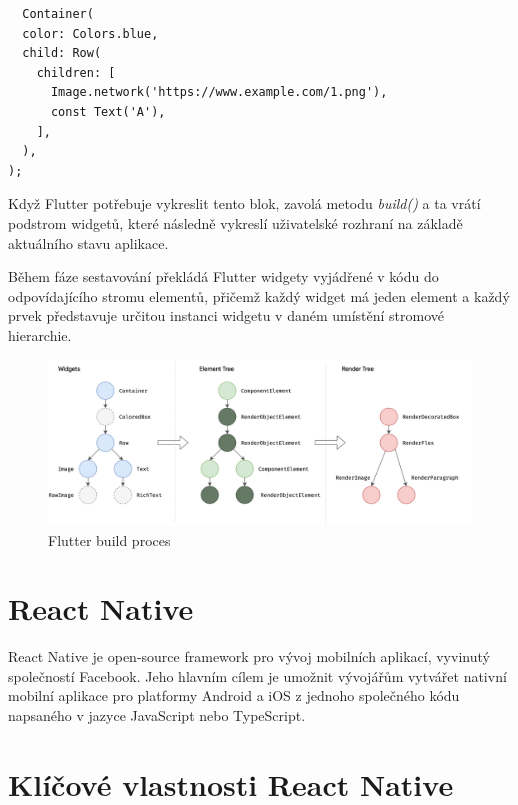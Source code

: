 \begin{lstlisting}
  Container(
  color: Colors.blue,
  child: Row(
    children: [
      Image.network('https://www.example.com/1.png'),
      const Text('A'),
    ],
  ),
);
\end{lstlisting}

Když Flutter potřebuje vykreslit tento blok, zavolá metodu \emph{build()} a ta vrátí podstrom widgetů, které následně vykreslí uživatelské 
rozhraní na základě aktuálního stavu aplikace. \cite*{flutterArchOverview}

Během fáze sestavování překládá Flutter widgety vyjádřené v kódu do odpovídajícího stromu elementů, přičemž každý widget má jeden element a 
každý prvek představuje určitou instanci widgetu v daném umístění stromové hierarchie. \cite*{flutterArchOverview}


\begin{figure}[H]
  \centering
  \includegraphics[width=1\textwidth]{flutter_trees.png}
  \caption{Flutter build proces}
  \label{fig:flutter_trees}
\end{figure}





\section{React Native}

React Native je open-source framework pro vývoj mobilních aplikací, vyvinutý společností Facebook. Jeho hlavním cílem je umožnit vývojářům vytvářet nativní mobilní aplikace pro platformy Android a iOS z jednoho společného kódu napsaného v jazyce JavaScript nebo TypeScript.

\section*{Klíčové vlastnosti React Native}

